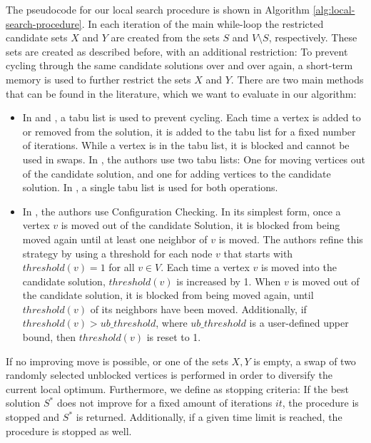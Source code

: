 \documentclass[draft,final]{vutinfth} %
\begin{document}
The pseudocode for our local search procedure is shown in Algorithm \ref{alg:local-search-procedure}. 
In each iteration of the main while-loop the restricted candidate sets $X$ and $Y$ are created from the sets $S$ and $V \setminus S$, respectively. These sets are created as described before, with an additional restriction: To prevent cycling through the same candidate solutions over and over again, a short-term memory is used to further restrict the sets $X$ and $Y$. There are two main methods that can be found in the literature, which we want to evaluate in our algorithm: 
\begin{itemize}
    \item In \cite{djeddi_extension_2019} and \cite{zhou_opposition-based_2020}, a tabu list is used to prevent cycling. Each time a vertex is added to or removed from the solution, it is added to the tabu list for a fixed number of iterations. While a vertex is in the tabu list, it is blocked and cannot be used in swaps. In \cite{djeddi_extension_2019}, the authors use two tabu lists: One for moving vertices out of the candidate solution, and one for adding vertices to the candidate solution. In \cite{zhou_opposition-based_2020}, a single tabu list is used for both operations. 
    \item In \cite{chen_nuqclq_2021}, the authors use Configuration Checking. In its simplest form, once a vertex $v$ is moved out of the candidate Solution, it is blocked from being moved again until at least one neighbor of $v$ is moved. The authors refine this strategy by using a threshold for each node $v$ that starts with $\mathit{threshold}(v) = 1$ for all $v \in V$. Each time a vertex $v$ is moved into the candidate solution, $\mathit{threshold}(v)$ is increased by 1. When $v$ is moved out of the candidate solution, it is blocked from being moved again, until $\mathit{threshold}(v)$ of its neighbors have been moved. Additionally, if $\mathit{threshold}(v) > \mathit{ub\_threshold}$, where $\mathit{ub\_threshold}$ is a user-defined upper bound, then $\mathit{threshold}(v)$ is reset to 1. 
\end{itemize}
If no improving move is possible, or one of the sets $X, Y$ is empty, a swap of two randomly selected unblocked vertices is performed in order to diversify the current local optimum. Furthermore, we define as stopping criteria: If the best solution $S^*$ does not improve for a fixed amount of iterations $\mathit{it}$, the procedure is stopped and $S^*$ is returned. Additionally, if a given time limit is reached, the procedure is stopped as well. 
\end{document}
